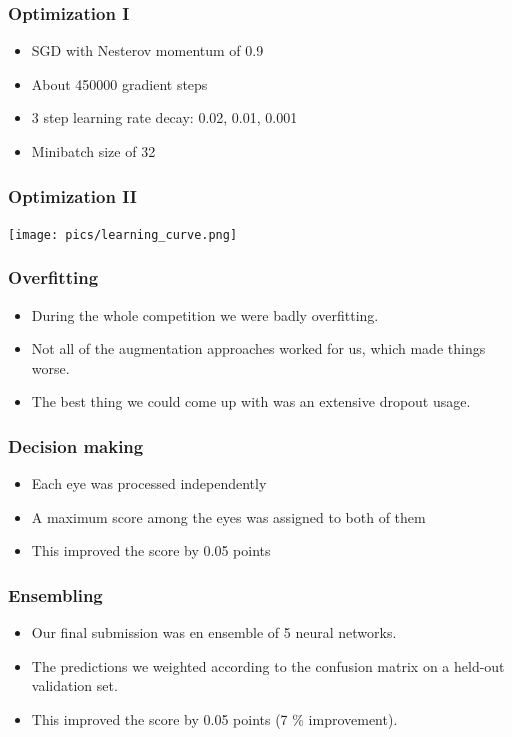 \begin{frame}\frametitle{Optimization I}
\begin{itemize}
\item SGD with Nesterov  momentum of 0.9
\item About 450000 gradient steps
\item 3 step learning rate decay: 0.02, 0.01, 0.001
\item Minibatch size of 32
\end{itemize}
\end{frame}

\begin{frame}\frametitle{Optimization II}
\vspace{-1cm}
\begin{center}
\texttt{[image: pics/learning\_curve.png]}
\end{center}
\end{frame}



\begin{frame}\frametitle{Overfitting}
\begin{itemize}
\item During the whole competition we were badly overfitting.
\item Not all of the augmentation approaches worked for us, which made things worse.
\item The best thing we could come up with was an extensive dropout usage.
\end{itemize}
\end{frame}

\begin{frame}\frametitle{Decision making}
\begin{itemize}
\item Each eye was processed independently
\item A  maximum score among the eyes was assigned to both of them
\item This improved the score by 0.05 points
\end{itemize}

\end{frame}

\begin{frame}\frametitle{Ensembling}
\begin{itemize}
\item Our final submission was en ensemble of 5 neural networks.
\item The predictions we weighted according to the confusion matrix on a held-out validation set.
\item This improved the score by 0.05 points (7 \% improvement).
\end{itemize}
\end{frame}


